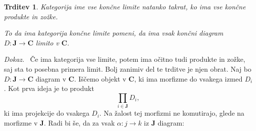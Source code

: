 \documentclass[12pt,a4paper]{book}
\theoremstyle{definition}
\theoremstyle{plain}
\newtheorem{trditev}[definicija]{Trditev}
\newenvironment{dokaz}{\emph{Dokaz.}\ }{\hspace{\fill}{$\Box$}}
\theoremstyle{definition}
\theoremstyle{remark}
\newcommand{\cat}[1]{\textbf{#1}}
\begin{document}
\begin{trditev} \label{konstrukcija limit}
Kategorija ime vse \emph{končne limite} natanko takrat, ko ima vse končne produkte in zožke.

To da ima kategorija končne limite pomeni, da ima vsak končni diagram $D : \cat{J} \to \cat{C}$ limito v $\cat{C}$.

\end{trditev}
\begin{dokaz}
Če ima kategorija vse limite, potem ima očitno tudi produkte in zožke, saj sta to posebna primera limit. Bolj zanimiv del te trditve je njen obrat.
Naj bo $D : \cat{J} \to \cat{C}$ diagram v $\cat{C}$. Iščemo objekt v $\cat{C}$, ki ima morfizme do vsakega izmed $D_i$. Kot prva ideja je to produkt 
$$\prod_{i \in \cat{J}}D_i,$$
ki ima projekcije do vsakega $D_i$. Na žalost tej morfizmi ne komutirajo, glede na morfizme v $\cat{J}$. Radi bi še, da za vsak $\alpha : j \to k$ iz  $\cat{J}$ diagram:


\end{dokaz}
\end{document}
